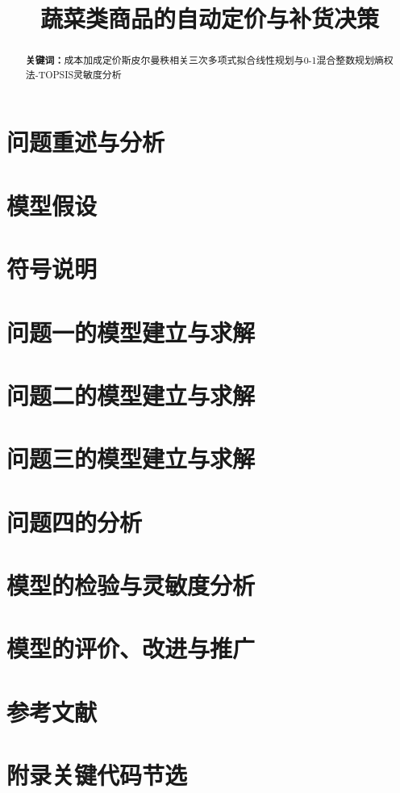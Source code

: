 \documentclass[12pt,a4paper,fontset=none]{ctexart}
\title{\textbf{蔬菜类商品的自动定价与补货决策}}
\date{}          %
\begin{document}
\maketitle

\begin{abstract}


\vspace{1.5em}   %
\par\noindent\textbf{关键词：}成本加成定价\quad 斯皮尔曼秩相关\quad 三次多项式拟合\quad 线性规划与0-1混合整数规划\quad 熵权法-TOPSIS\quad 灵敏度分析
\end{abstract}

\section{问题重述与分析}


\section{模型假设}


\section{符号说明}


\section{问题一的模型建立与求解}


\section{问题二的模型建立与求解}


\section{问题三的模型建立与求解}


\section{问题四的分析}


\section{模型的检验与灵敏度分析}


\section{模型的评价、改进与推广}


\section{参考文献}


\newpage
\section*{附录\quad 关键代码节选}

\end{document}
